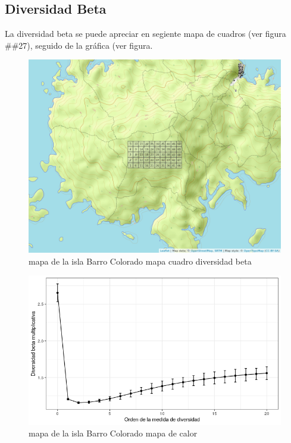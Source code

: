 \documentclass[11pt,]{article}
\begin{document}
\subsection{Diversidad Beta}\label{diversidad-beta}

La diversidad beta se puede apreciar en segiente mapa de cuadros (ver
figura \#\#27), seguido de la gráfica (ver figura.

\begin{figure}
\centering
\includegraphics[width=1.00000\textwidth]{mapa_cuadros.png}
\caption{mapa de la isla Barro Colorado mapa cuadro diversidad beta
\label{fig:bci_map}}
\end{figure}

\begin{figure}
\centering
\includegraphics[width=1.00000\textwidth]{diversidad_beta.png}
\caption{mapa de la isla Barro Colorado mapa de calor
\label{fig:bci_map}}
\end{figure}
\end{document}

